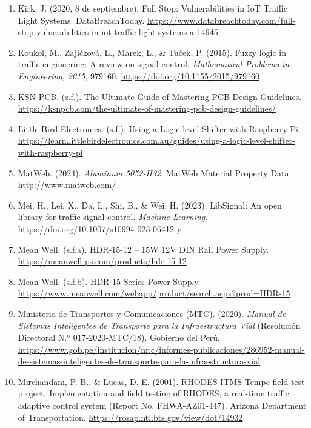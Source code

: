 \begin{enumerate}
  Khan, A., Rahman, S. u., Ullah, F., Khattak, M. I., Bait-Suwailam, M. M., \& El Sayed, H. (2024). V2I-VTL: IoT-Enabled adaptive traffic light controller and emission reduction at intersection. PeerJ Computer Science, 10, e2507. \url{https://peerj.com/articles/cs-2507/}
\item
  Kirk, J. (2020, 8 de septiembre). Full Stop: Vulnerabilities in IoT Traffic Light Systems. DataBreachToday. \url{https://www.databreachtoday.com/full-stop-vulnerabilities-in-iot-traffic-light-systems-a-14945}
\item
  Koukol, M., Zajíčková, L., Marek, L., \& Tuček, P. (2015). Fuzzy logic in traffic engineering: A review on signal control. \emph{Mathematical Problems in Engineering, 2015}, 979160. \url{https://doi.org/10.1155/2015/979160}
\item
  KSN PCB. (s.f.). The Ultimate Guide of Mastering PCB Design Guidelines. \url{https://ksnpcb.com/the-ultimate-of-mastering-pcb-design-guidelines/}
\item
  Little Bird Electronics. (s.f.). Using a Logic-level Shifter with Raspberry Pi. \url{https://learn.littlebirdelectronics.com.au/guides/using-a-logic-level-shifter-with-raspberry-pi}
\item
  MatWeb. (2024). \emph{Aluminum 5052-H32}. MatWeb Material Property Data. \url{http://www.matweb.com/}
\item
  Mei, H., Lei, X., Da, L., Shi, B., \& Wei, H. (2023). LibSignal: An open library for traffic signal control. \emph{Machine Learning}. \url{https://doi.org/10.1007/s10994-023-06412-y}
\item
  Mean Well. (s.f.a). HDR-15-12 -- 15W 12V DIN Rail Power Supply. \url{https://meanwell-ps.com/products/hdr-15-12}
\item
  Mean Well. (s.f.b). HDR-15 Series Power Supply. \url{https://www.meanwell.com/webapp/product/search.aspx?prod=HDR-15}
\item
  Ministerio de Transportes y Comunicaciones (MTC). (2020). \emph{Manual de Sistemas Inteligentes de Transporte para la Infraestructura Vial} (Resolución Directoral N.º 017-2020-MTC/18). Gobierno del Perú. \url{https://www.gob.pe/institucion/mtc/informes-publicaciones/286952-manual-de-sistemas-inteligentes-de-transporte-para-la-infraestructura-vial}
\item
  Mirchandani, P. B., \& Lucas, D. E. (2001). RHODES-ITMS Tempe field test project: Implementation and field testing of RHODES, a real-time traffic adaptive control system (Report No. FHWA-AZ01-447). Arizona Department of Transportation. \url{https://rosap.ntl.bts.gov/view/dot/14932}

\end{enumerate}

